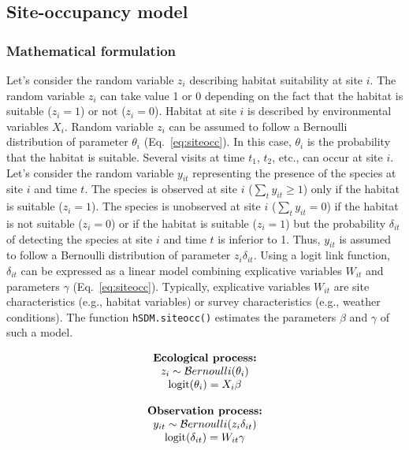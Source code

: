 \documentclass[a4paper, 12pt, leqno]{article}\usepackage[]{graphicx}\usepackage[]{color}
\newcommand{\logit}{\text{logit}}
\begin{document}
\newpage

\subsection{Site-occupancy model}

\subsubsection{Mathematical formulation}

Let's consider the random variable $z_i$ describing habitat suitability at site $i$. The
random variable $z_i$ can take value 1 or 0 depending on the fact that the habitat is
suitable ($z_i=1$) or not ($z_i=0$). Habitat at site $i$ is described by environmental
variables $X_i$. Random variable $z_i$ can be assumed to follow a Bernoulli distribution
of parameter $\theta_i$ (Eq.~\ref{eq:siteocc}). In this case, $\theta_i$ is the
probability that the habitat is suitable. Several visits at time $t_1$, $t_2$, etc., can
occur at site $i$. Let's consider the random variable $y_{it}$ representing the presence
of the species at site $i$ and time $t$. The species is observed at site $i$
($\sum_t{y_{it}} \geq 1$) only if the habitat is suitable ($z_i=1$). The species is
unobserved at site $i$ ($\sum_t{y_{it}}=0$) if the habitat is not suitable ($z_i=0$) or if
the habitat is suitable ($z_i=1$) but the probability $\delta_{it}$ of detecting the
species at site $i$ and time $t$ is inferior to 1. Thus, $y_{it}$ is assumed to follow a
Bernoulli distribution of parameter $z_i \delta_{it}$. Using a logit link function,
$\delta_{it}$ can be expressed as a linear model combining explicative variables $W_{it}$
and parameters $\gamma$ (Eq.~\ref{eq:siteocc}). Typically, explicative variables
$W_{it}$ are site characteristics (e.g., habitat variables) or survey characteristics
(e.g., weather conditions). The function \texttt{hSDM.siteocc()} estimates the parameters
$\beta$ and $\gamma$ of such a model.

\begin{equation}
  \begin{tabular}{c}
    \textbf{Ecological process:}\\
    $z_i \sim \mathcal{B}ernoulli(\theta_i)$ \\
    $\logit(\theta_i) = X_i \beta$\\
    ~ \\
    \textbf{Observation process:}\\
    $y_{it} \sim \mathcal{B}ernoulli(z_i \delta_{it})$ \\
    $\logit(\delta_{it}) = W_{it} \gamma$ \\
  \end{tabular}
  \label{eq:siteocc}
\end{equation}
\end{document}
